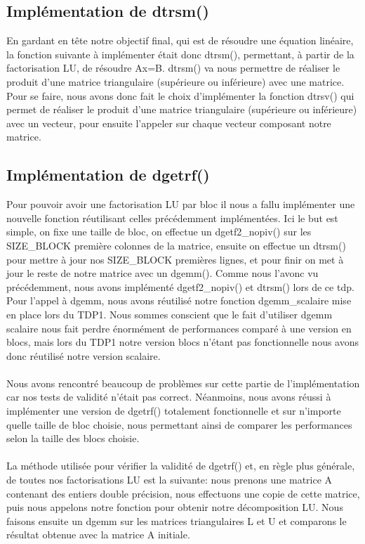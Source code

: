 \documentclass{article}
\begin{document}
\subsection{Implémentation de dtrsm()}En gardant en tête notre objectif final, qui est de résoudre une équation linéaire, la fonction suivante à implémenter était donc dtrsm(), permettant, à partir de la factorisation LU, de résoudre Ax=B. dtrsm() va nous permettre de réaliser le produit d'une matrice triangulaire (supérieure ou inférieure) avec une matrice. Pour se faire, nous avons donc fait le choix d'implémenter la fonction dtrsv() qui permet de réaliser le produit d'une matrice triangulaire (supérieure ou inférieure) avec un vecteur, pour ensuite l'appeler sur chaque vecteur composant notre matrice.

\subsection{Implémentation de dgetrf()}Pour pouvoir avoir une factorisation LU par bloc il nous a fallu implémenter une nouvelle fonction réutilisant celles précédemment implémentées. Ici le but est simple, on fixe une taille de bloc, on effectue un dgetf2\_nopiv() sur les SIZE\_BLOCK première colonnes de la matrice, ensuite on effectue un dtrsm() pour mettre à jour nos SIZE\_BLOCK premières lignes, et pour finir on met à jour le reste de notre matrice avec un dgemm(). Comme nous l'avonc vu précédemment, nous avons implémenté dgetf2\_nopiv() et dtrsm() lors de ce tdp. Pour l'appel à dgemm, nous avons réutilisé notre fonction dgemm\_scalaire mise en place lors du TDP1. Nous sommes conscient que le fait d'utiliser dgemm scalaire nous fait perdre
énormément de performances comparé à une version en blocs, mais lors du TDP1 notre version blocs n'étant pas fonctionnelle nous avons donc réutilisé notre version scalaire.

\paragraph{}Nous avons rencontré beaucoup de problèmes sur cette partie de l'implémentation car nos tests de validité n'était pas correct. Néanmoins, nous avons réussi à implémenter une version de dgetrf() totalement fonctionnelle et sur n'importe quelle taille de bloc choisie, nous permettant ainsi de comparer les performances selon la taille des blocs choisie.

\paragraph{}La méthode utilisée pour vérifier la validité de dgetrf() et, en règle plus générale, de toutes nos factorisations LU est la suivante: nous prenons une matrice A contenant des entiers double précision, nous effectuons une copie de cette matrice, puis nous appelons notre fonction pour obtenir notre décomposition LU. Nous faisons ensuite un dgemm sur les matrices triangulaires L et U et comparons le résultat obtenue avec la matrice A initiale.
\end{document}
